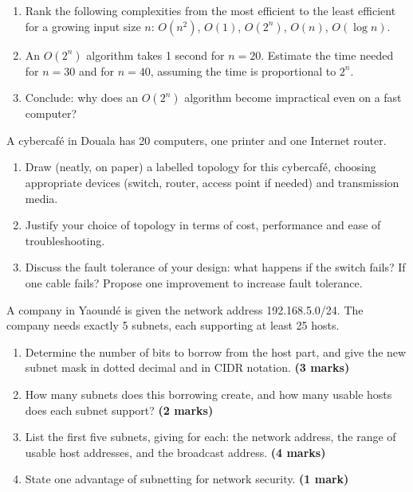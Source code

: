 \documentclass[11pt]{article}
\newcounter{popsec}
\newcounter{popsub}
\newcommand{\courssub}[1]{%
  \stepcounter{popsub}%
  \par\vspace{9pt}\noindent{\popxbold\fontsize{11.5}{13}\selectfont\color{popink}{\color{poporange}\thepopsec.\thepopsub}\hspace{6pt}#1}\par\nopagebreak\vspace{4pt}
}
\begin{document}
\begin{exercice}
\begin{enumerate}
\item Rank the following complexities from the most efficient to the least efficient for a growing input size $n$: $O(n^2)$, $O(1)$, $O(2^n)$, $O(n)$, $O(\log n)$.
\item An $O(2^n)$ algorithm takes 1 second for $n = 20$. Estimate the time needed for $n = 30$ and for $n = 40$, assuming the time is proportional to $2^n$.
\item Conclude: why does an $O(2^n)$ algorithm become impractical even on a fast computer?
\end{enumerate}
\end{exercice}

\begin{exercice}
A cybercafé in Douala has 20 computers, one printer and one Internet router.
\begin{enumerate}
\item Draw (neatly, on paper) a labelled topology for this cybercafé, choosing appropriate devices (switch, router, access point if needed) and transmission media.
\item Justify your choice of topology in terms of cost, performance and ease of troubleshooting.
\item Discuss the fault tolerance of your design: what happens if the switch fails? If one cable fails? Propose one improvement to increase fault tolerance.
\end{enumerate}
\end{exercice}

\courssub{I prepare for the GCE}

\begin{exercice}
A company in Yaoundé is given the network address 192.168.5.0/24. The company needs exactly 5 subnets, each supporting at least 25 hosts.
\begin{enumerate}
\item Determine the number of bits to borrow from the host part, and give the new subnet mask in dotted decimal and in CIDR notation. \textbf{(3 marks)}
\item How many subnets does this borrowing create, and how many usable hosts does each subnet support? \textbf{(2 marks)}
\item List the first five subnets, giving for each: the network address, the range of usable host addresses, and the broadcast address. \textbf{(4 marks)}
\item State one advantage of subnetting for network security. \textbf{(1 mark)}
\end{enumerate}
\end{exercice}
\end{document}
